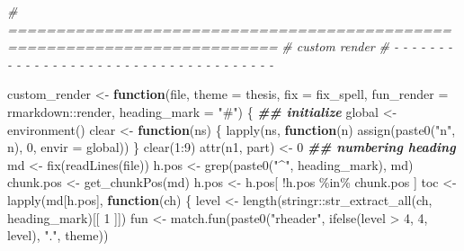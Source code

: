 \documentclass[
]{article}
\newenvironment{Shaded}{\begin{snugshade}}{\end{snugshade}}
\newcommand{\AttributeTok}[1]{\textcolor[rgb]{0.77,0.63,0.00}{#1}}
\newcommand{\CommentTok}[1]{\textcolor[rgb]{0.56,0.35,0.01}{\textit{#1}}}
\newcommand{\ControlFlowTok}[1]{\textcolor[rgb]{0.13,0.29,0.53}{\textbf{#1}}}
\newcommand{\DecValTok}[1]{\textcolor[rgb]{0.00,0.00,0.81}{#1}}
\newcommand{\DocumentationTok}[1]{\textcolor[rgb]{0.56,0.35,0.01}{\textbf{\textit{#1}}}}
\newcommand{\FunctionTok}[1]{\textcolor[rgb]{0.00,0.00,0.00}{#1}}
\newcommand{\NormalTok}[1]{#1}
\newcommand{\OtherTok}[1]{\textcolor[rgb]{0.56,0.35,0.01}{#1}}
\newcommand{\SpecialCharTok}[1]{\textcolor[rgb]{0.00,0.00,0.00}{#1}}
\newcommand{\StringTok}[1]{\textcolor[rgb]{0.31,0.60,0.02}{#1}}
\begin{document}
\begin{Shaded}
\begin{Highlighting}[]
\CommentTok{\# ==========================================================================}
\CommentTok{\# custom render}
\CommentTok{\# {-} {-} {-} {-} {-} {-} {-} {-} {-} {-} {-} {-} {-} {-} {-} {-} {-} {-} {-} {-} {-} {-} {-} {-} {-} {-} {-} {-} {-} {-} {-} {-} {-} {-} {-} {-} {-}}

\NormalTok{custom\_render }\OtherTok{\textless{}{-}} \ControlFlowTok{function}\NormalTok{(file, }\AttributeTok{theme =} \StringTok{\textquotesingle{}thesis\textquotesingle{}}\NormalTok{, }\AttributeTok{fix =}\NormalTok{ fix\_spell,}
  \AttributeTok{fun\_render =}\NormalTok{ rmarkdown}\SpecialCharTok{::}\NormalTok{render, }\AttributeTok{heading\_mark =} \StringTok{"\#"}\NormalTok{) \{}
  \DocumentationTok{\#\# initialize}
\NormalTok{  global }\OtherTok{\textless{}{-}} \FunctionTok{environment}\NormalTok{()}
\NormalTok{  clear }\OtherTok{\textless{}{-}} \ControlFlowTok{function}\NormalTok{(ns) \{}
    \FunctionTok{lapply}\NormalTok{(ns, }\ControlFlowTok{function}\NormalTok{(n) }\FunctionTok{assign}\NormalTok{(}\FunctionTok{paste0}\NormalTok{(}\StringTok{"n"}\NormalTok{, n), }\DecValTok{0}\NormalTok{, }\AttributeTok{envir =}\NormalTok{ global))}
\NormalTok{  \}}
  \FunctionTok{clear}\NormalTok{(}\DecValTok{1}\SpecialCharTok{:}\DecValTok{9}\NormalTok{)}
  \FunctionTok{attr}\NormalTok{(n1, }\StringTok{\textquotesingle{}part\textquotesingle{}}\NormalTok{) }\OtherTok{\textless{}{-}} \DecValTok{0}
  \DocumentationTok{\#\# numbering heading}
\NormalTok{  md }\OtherTok{\textless{}{-}} \FunctionTok{fix}\NormalTok{(}\FunctionTok{readLines}\NormalTok{(file))}
\NormalTok{  h.pos }\OtherTok{\textless{}{-}} \FunctionTok{grep}\NormalTok{(}\FunctionTok{paste0}\NormalTok{(}\StringTok{"\^{}"}\NormalTok{, heading\_mark), md)}
\NormalTok{  chunk.pos }\OtherTok{\textless{}{-}} \FunctionTok{get\_chunkPos}\NormalTok{(md)}
\NormalTok{  h.pos }\OtherTok{\textless{}{-}}\NormalTok{ h.pos[ }\SpecialCharTok{!}\NormalTok{h.pos }\SpecialCharTok{\%in\%}\NormalTok{ chunk.pos ]}
\NormalTok{  toc }\OtherTok{\textless{}{-}} \FunctionTok{lapply}\NormalTok{(md[h.pos],}
    \ControlFlowTok{function}\NormalTok{(ch) \{}
\NormalTok{      level }\OtherTok{\textless{}{-}} \FunctionTok{length}\NormalTok{(stringr}\SpecialCharTok{::}\FunctionTok{str\_extract\_all}\NormalTok{(ch, heading\_mark)[[ }\DecValTok{1}\NormalTok{ ]])}
\NormalTok{      fun }\OtherTok{\textless{}{-}} \FunctionTok{match.fun}\NormalTok{(}\FunctionTok{paste0}\NormalTok{(}\StringTok{"rheader"}\NormalTok{, }\FunctionTok{ifelse}\NormalTok{(level }\SpecialCharTok{\textgreater{}} \DecValTok{4}\NormalTok{, }\DecValTok{4}\NormalTok{, level), }\StringTok{"."}\NormalTok{, theme))}

\end{Highlighting}
\end{Shaded}
\end{document}
